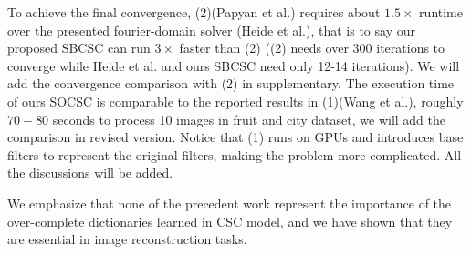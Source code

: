 \documentclass[10pt,twocolumn,letterpaper]{article}
\begin{document}
To achieve the final convergence, (2)(Papyan et al.) requires about $1.5 \times$ runtime over the presented fourier-domain solver (Heide et al.), that is to say our proposed SBCSC can run $3 \times$ faster than (2) ((2) needs over 300 iterations to converge while Heide et al. and ours SBCSC need only 12-14 iterations). We will add the convergence comparison with (2) in supplementary. The execution time of ours SOCSC is comparable to the reported results in (1)(Wang et al.), roughly $70-80$ seconds to process 10 images in fruit and city dataset, we will add the comparison in revised version. Notice that (1) runs on GPUs and introduces base filters to represent the original filters, making the problem more complicated. All the discussions will be added.

We emphasize that none of the precedent work represent the importance of the over-complete dictionaries learned in CSC model, and we have shown that they are essential in image reconstruction tasks.

%
%
\end{document}
